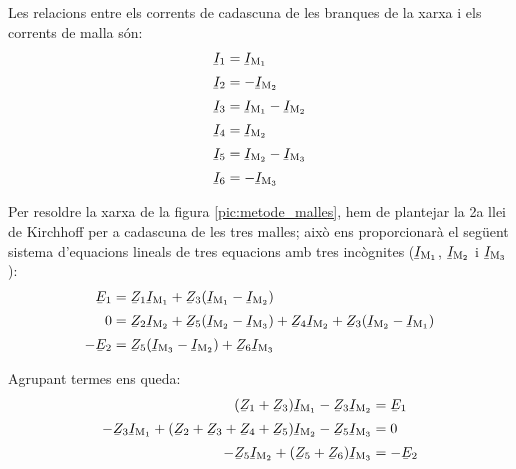 Les relacions entre els corrents de cadascuna de les branques de la xarxa i els corrents de malla són:
\begin{subequations}
\begin{align}
    \cmplx{I}_1 &= \cmplx{I}\ped{M_1} \label{eq:malles1} \\[0.5ex]
    \cmplx{I}_2 &= -\cmplx{I}\ped{M_2} \\[0.5ex]
    \cmplx{I}_3 &= \cmplx{I}\ped{M_1}-\cmplx{I}\ped{M_2} \\[0.5ex]
    \cmplx{I}_4 &= \cmplx{I}\ped{M_2} \\[0.5ex]
    \cmplx{I}_5 &= \cmplx{I}\ped{M_2}-\cmplx{I}\ped{M_3} \\[0.5ex]
    \cmplx{I}_6 &= -\cmplx{I}\ped{M_3} \label{eq:malles2}
\end{align}
\end{subequations}

Per resoldre la xarxa de la figura \vref{pic:metode_malles}, hem de plantejar la 2a llei de Kirchhoff per a cadascuna de les tres malles; això ens proporcionarà el següent sistema d'equacions lineals de tres equacions amb tres incògnites ($\cmplx{I}\ped{M_1}$, $\cmplx{I}\ped{M_2}$ i $\cmplx{I}\ped{M_3}$):
\begin{subequations}
\begin{align}
    \cmplx{E}_1 &= \cmplx{Z}_1 \cmplx{I}\ped{M_1} + \cmplx{Z}_3 (\cmplx{I}\ped{M_1}-\cmplx{I}\ped{M_2}) \\[0.5ex]
    0 &= \cmplx{Z}_2 \cmplx{I}\ped{M_2} + \cmplx{Z}_5(\cmplx{I}\ped{M_2}-\cmplx{I}\ped{M_3}) + \cmplx{Z}_4 \cmplx{I}\ped{M_2} + \cmplx{Z}_3(\cmplx{I}\ped{M_2}-\cmplx{I}\ped{M_1}) \\[0.5ex]
    -\cmplx{E}_2 &=  \cmplx{Z}_5 (\cmplx{I}\ped{M_3}-\cmplx{I}\ped{M_2})+\cmplx{Z}_6 \cmplx{I}\ped{M_3}
\end{align}
\end{subequations}

Agrupant termes ens queda:
\begin{subequations}
\begin{align}
    (\cmplx{Z}_1 + \cmplx{Z}_3) \cmplx{I}\ped{M_1} - \cmplx{Z}_3 \cmplx{I}\ped{M_2} &= \cmplx{E}_1 \\[0.5ex]
    -\cmplx{Z}_3 \cmplx{I}\ped{M_1} + (\cmplx{Z}_2 + \cmplx{Z}_3+ \cmplx{Z}_4+ \cmplx{Z}_5)\cmplx{I}\ped{M_2} - \cmplx{Z}_5 \cmplx{I}\ped{M_3} &= 0 \\[0.5ex]
     -\cmplx{Z}_5 \cmplx{I}\ped{M_2} +  (\cmplx{Z}_5 + \cmplx{Z}_6) \cmplx{I}\ped{M_3} &= -\cmplx{E}_2
\end{align}
\end{subequations}


